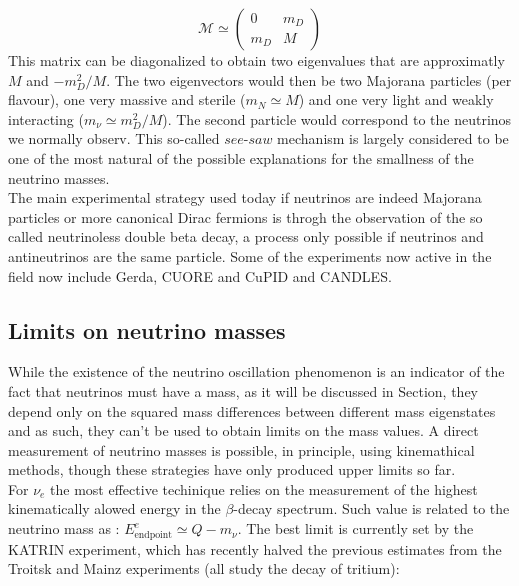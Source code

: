 \documentclass[12pt,a4paper,openright,twoside]{report}
\begin{document}
\begin{equation}
\mathcal{M}\simeq \begin{pmatrix}
0 & m_D \\
m_D & M
\end{pmatrix}
\end{equation} 
This matrix can be diagonalized to obtain two eigenvalues that are approximatly $M$ and $-m_D^2/M$. The two eigenvectors would then be two Majorana particles (per flavour), one very massive and sterile ($m_N\simeq M$) and one very light and weakly interacting ($m_\nu\simeq m_D^2/M$). The second particle would correspond to the neutrinos we normally observ. This so-called $see$-$saw$ mechanism is largely considered to be one of the most natural of the possible explanations for the smallness of the neutrino masses.\\

The main experimental strategy used today if neutrinos are indeed Majorana particles or more canonical Dirac fermions is throgh the observation of the so called neutrinoless double beta decay, a process only possible if neutrinos and antineutrinos are the same particle. Some of the experiments now active in the field now include Gerda, CUORE and CuPID and CANDLES.


\subsection{Limits on neutrino masses}

While the existence of the neutrino oscillation phenomenon is an indicator of the fact that neutrinos must have a mass, as it will be discussed in Section, they depend only on the squared mass differences between different mass eigenstates and as such, they can't be used to obtain limits on the mass values. A direct measurement of neutrino masses is possible, in principle, using kinemathical methods, though these strategies have only produced upper limits so far.\\
For  $\nu_e$ the most effective techinique relies on the measurement of the highest kinematically alowed energy in the $\beta$-decay spectrum. Such value is related to the neutrino mass as : $E_{\text{endpoint}}^e\simeq Q -m_\nu$. The best limit is currently set by the KATRIN experiment, which has recently halved the previous estimates from the Troitsk and Mainz experiments (all study the decay of tritium):
\end{document}
